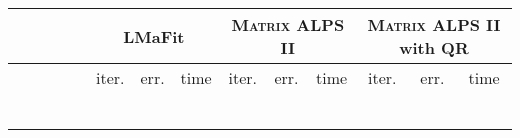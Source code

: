\documentclass[twocolumn]{svjour3}
\begin{document}
\begin{table*} [!htp]
\begin{center}
\begin{tabular}{|c|c|c|c|c|c|c|c|c|c|c|c|c|c}
\multicolumn{4}{c|}{} & & \multicolumn{3}{|c|}{LMaFit} & \multicolumn{3}{|c}{\textsc{Matrix ALPS II}} & \multicolumn{3}{|c}{\textsc{Matrix ALPS II} with QR}  \\
\hline \hline
\multicolumn{1}{c}{}  & \multicolumn{1}{c}{} & \multicolumn{1}{c}{} & \multicolumn{1}{c|}{} & & 
\multicolumn{1}{|c}{\rm{iter.}} & \multicolumn{1}{c}{\rm{err.}} & \multicolumn{1}{c|}{\rm{time}} & 
\multicolumn{1}{|c}{\rm{iter.}} & \multicolumn{1}{c}{\rm{err.}} & \multicolumn{1}{c|}{\rm{time}} &
\multicolumn{1}{|c}{\rm{iter.}} & \multicolumn{1}{c}{\rm{err.}} & \multicolumn{1}{c}{\rm{time}}  \\
\hline
\multicolumn{1}{c}{} & \multicolumn{1}{c}{} & \multicolumn{1}{c}{}  & \multicolumn{1}{c|}{} &  & 
\multicolumn{1}{|c}{} & \multicolumn{1}{c}{} & \multicolumn{1}{c|}{} &
\multicolumn{1}{|c}{} & \multicolumn{1}{c}{} & \multicolumn{1}{c}{} &
\multicolumn{1}{|c}{} & \multicolumn{1}{c}{} & \multicolumn{1}{c}{} \\
\hline
\multicolumn{1}{c}{} & \multicolumn{1}{c}{} & \multicolumn{1}{c}{}  & \multicolumn{1}{c|}{} &  & 
\multicolumn{1}{|c}{} & \multicolumn{1}{c}{} & \multicolumn{1}{c|}{} &
\multicolumn{1}{|c}{} & \multicolumn{1}{c}{} & \multicolumn{1}{c}{} &
\multicolumn{1}{|c}{} & \multicolumn{1}{c}{} & \multicolumn{1}{c}{} \\
\hline
\multicolumn{1}{c}{} & \multicolumn{1}{c}{} & \multicolumn{1}{c}{}  & \multicolumn{1}{c|}{} &  & 
\multicolumn{1}{|c}{} & \multicolumn{1}{c}{} & \multicolumn{1}{c|}{} &
\multicolumn{1}{|c}{} & \multicolumn{1}{c}{} & \multicolumn{1}{c}{} &
\multicolumn{1}{|c}{} & \multicolumn{1}{c}{} & \multicolumn{1}{c}{} \\
\hline
\multicolumn{1}{c}{} & \multicolumn{1}{c}{} & \multicolumn{1}{c}{}  & \multicolumn{1}{c|}{} &  & 
\multicolumn{1}{|c}{} & \multicolumn{1}{c}{} & \multicolumn{1}{c|}{} &
\multicolumn{1}{|c}{} & \multicolumn{1}{c}{} & \multicolumn{1}{c}{} &
\multicolumn{1}{|c}{} & \multicolumn{1}{c}{} & \multicolumn{1}{c}{} \\
\hline
\multicolumn{1}{c}{} & \multicolumn{1}{c}{} & \multicolumn{1}{c}{}  & \multicolumn{1}{c|}{} &  & 
\multicolumn{1}{|c}{} & \multicolumn{1}{c}{} & \multicolumn{1}{c|}{} &
\multicolumn{1}{|c}{} & \multicolumn{1}{c}{} & \multicolumn{1}{c}{} &
\multicolumn{1}{|c}{} & \multicolumn{1}{c}{} & \multicolumn{1}{c}{} \\
\hline
\multicolumn{1}{c}{} & \multicolumn{1}{c}{} & \multicolumn{1}{c}{}  & \multicolumn{1}{c|}{} &  & 
\multicolumn{1}{|c}{} & \multicolumn{1}{c}{} & \multicolumn{1}{c|}{} &

\end{tabular}
\end{center}
\end{table*}
\end{document}
